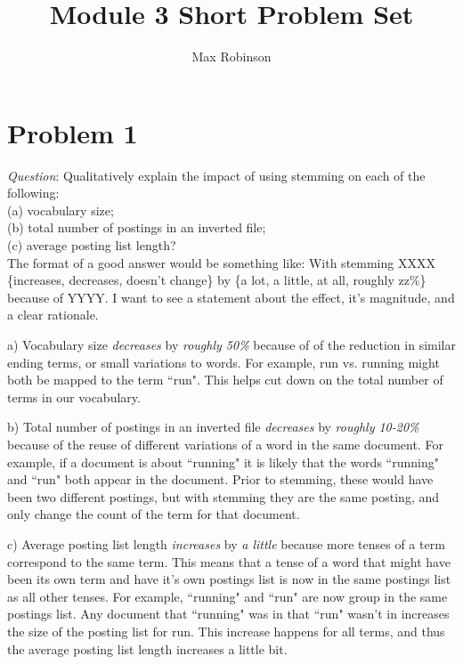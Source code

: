 \documentclass{article}
\begin{document}
\title{Module 3 Short Problem Set}
\author{Max Robinson}
\date{}
\maketitle


\section{Problem 1}
\noindent \textit{Question}: Qualitatively explain the impact of using stemming on each of the following: \\
(a) vocabulary size; \\
(b) total number of postings in an inverted file; \\
(c) average posting list length? \\
The format of a good answer would be something like: With stemming XXXX \{increases, decreases, doesn’t change\} by \{a lot, a little, at all, roughly zz\%\} because of YYYY. I want to see a statement about the effect, it's magnitude, and a clear rationale.
\newline

a) Vocabulary size \emph{decreases} by \emph{roughly 50\%} because of of the reduction in similar ending terms, or small variations to words. For example, run vs. running might both be mapped to the term ``run". This helps cut down on the total number of terms in our vocabulary. 

b) Total number of postings in an inverted file \emph{decreases} by  \emph{roughly 10-20\%} because of the reuse of different variations of a word in the same document. For example, if a document is about ``running" it is likely that the words ``running" and ``run" both appear in the document. Prior to stemming, these would have been two different postings, but with stemming they are the same posting, and only change the count of the term for that document. 

c) Average posting list length \emph{increases} by \emph{a little} because more tenses of a term correspond to the same term. This means that a tense of a word that might have been its own term and have it's own postings list is now in the same postings list as all other tenses. For example, ``running" and ``run" are now group in the same postings list. Any document that ``running" was in that ``run" wasn't in increases the size of the posting list for run. This increase happens for all terms, and thus the average posting list length increases a little bit. 
\end{document}
